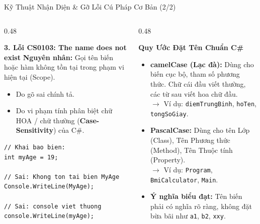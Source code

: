 \documentclass[aspectratio=169, 10pt]{beamer}
\begin{document}
\begin{frame}[fragile]{Kỹ Thuật Nhận Diện \& Gỡ Lỗi Cú Pháp Cơ Bản (2/2)}
  \begin{columns}[T]
    \begin{column}{0.48\textwidth}
      \begin{alertblock}{\textbf{3. Lỗi CS0103: The name does not exist}}
        \textbf{Nguyên nhân:} Gọi tên biến hoặc hàm không tồn tại trong phạm vi hiện tại (Scope).
        \begin{itemize}
          \item Do gõ sai chính tả.
          \item Do vi phạm tính phân biệt chữ HOA / chữ thường (\textbf{Case-Sensitivity}) của C\#.
        \end{itemize}
\begin{lstlisting}
// Khai bao bien:
int myAge = 19;

// Sai: Khong ton tai bien MyAge
Console.WriteLine(MyAge); 

// Sai: console viet thuong
console.WriteLine(myAge); 
\end{lstlisting}
      \end{alertblock}
    \end{column}
    \begin{column}{0.48\textwidth}
      \begin{block}{\textbf{Quy Ước Đặt Tên Chuẩn C\#}}
        \begin{itemize}
          \item \textbf{camelCase (Lạc đà):} Dùng cho biến cục bộ, tham số phương thức. Chữ cái đầu viết thường, các từ sau viết hoa chữ đầu.\\
            $\to$ Ví dụ: \texttt{diemTrungBinh}, \texttt{hoTen}, \texttt{tongSoGiay}.
          \item \textbf{PascalCase:} Dùng cho tên Lớp (Class), Tên Phương thức (Method), Tên Thuộc tính (Property).\\
            $\to$ Ví dụ: \texttt{Program}, \texttt{BmiCalculator}, \texttt{Main}.
          \item \textbf{Ý nghĩa biểu đạt:} Tên biến phải có nghĩa rõ ràng, không đặt bừa bãi như \texttt{a1}, \texttt{b2}, \texttt{xxy}.
        \end{itemize}
      \end{block}
    \end{column}
  \end{columns}
\end{frame}
\end{document}
